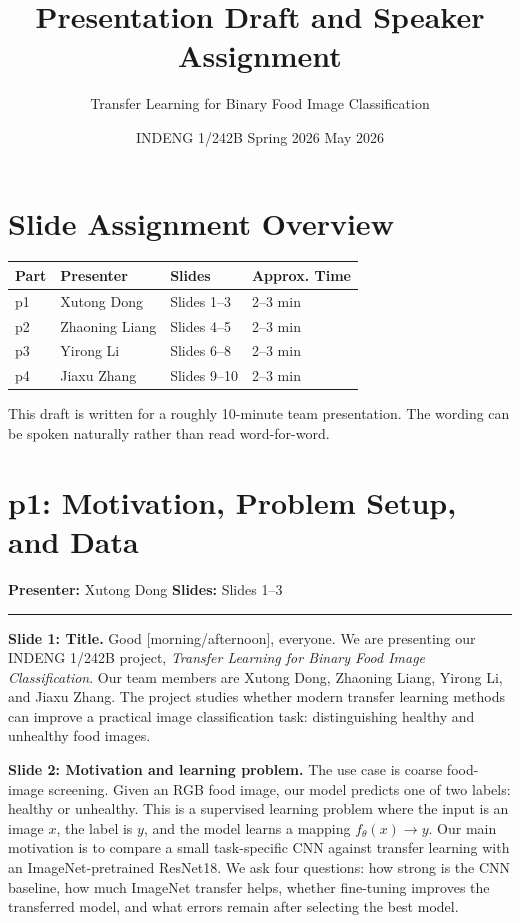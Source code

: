 \documentclass[11pt]{article}
\title{\textcolor{BerkeleyBlue}{Presentation Draft and Speaker Assignment}}
\author{Transfer Learning for Binary Food Image Classification}
\date{INDENG 1/242B Spring 2026 \quad May 2026}
\newcommand{\parthead}[4]{%
  \section*{\textcolor{BerkeleyBlue}{#1: #2}}%
  \noindent\textbf{Presenter:} #3 \hfill \textbf{Slides:} #4%
  \par\vspace{0.4em}\hrule\vspace{0.8em}
}
\begin{document}
\maketitle

\section*{Slide Assignment Overview}

\begin{table}[h]
\centering
\begin{tabular}{llll}
\toprule
Part & Presenter & Slides & Approx. Time \\
\midrule
p1 & Xutong Dong & Slides 1--3 & 2--3 min \\
p2 & Zhaoning Liang & Slides 4--5 & 2--3 min \\
p3 & Yirong Li & Slides 6--8 & 2--3 min \\
p4 & Jiaxu Zhang & Slides 9--10 & 2--3 min \\
\bottomrule
\end{tabular}
\end{table}

\noindent This draft is written for a roughly 10-minute team presentation. The wording can be spoken naturally rather than read word-for-word.

\parthead{p1}{Motivation, Problem Setup, and Data}{Xutong Dong}{Slides 1--3}

\textbf{Slide 1: Title.}
Good [morning/afternoon], everyone. We are presenting our INDENG 1/242B project, \emph{Transfer Learning for Binary Food Image Classification}. Our team members are Xutong Dong, Zhaoning Liang, Yirong Li, and Jiaxu Zhang. The project studies whether modern transfer learning methods can improve a practical image classification task: distinguishing healthy and unhealthy food images.

\textbf{Slide 2: Motivation and learning problem.}
The use case is coarse food-image screening. Given an RGB food image, our model predicts one of two labels: healthy or unhealthy. This is a supervised learning problem where the input is an image \(x\), the label is \(y\), and the model learns a mapping \(f_\theta(x)\rightarrow y\). Our main motivation is to compare a small task-specific CNN against transfer learning with an ImageNet-pretrained ResNet18. We ask four questions: how strong is the CNN baseline, how much ImageNet transfer helps, whether fine-tuning improves the transferred model, and what errors remain after selecting the best model.
\end{document}
